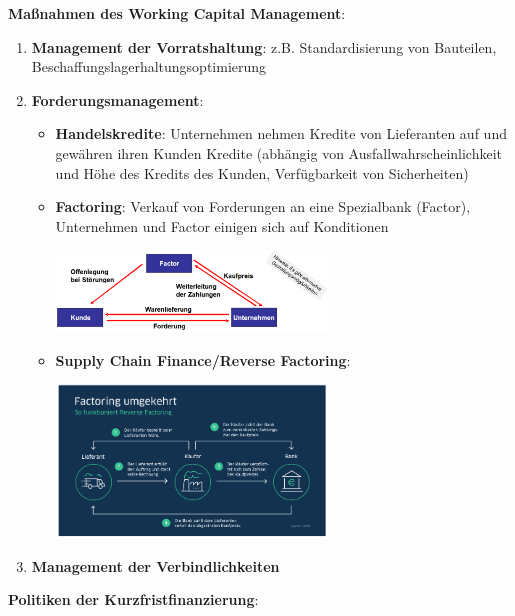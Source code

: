 \textbf{Maßnahmen des Working Capital Management}:
\begin{enumerate}
	\item \textbf{Management der Vorratshaltung}: z.B. Standardisierung von Bauteilen, Beschaffungslagerhaltungsoptimierung
	\item \textbf{Forderungsmanagement}: 
	\begin{itemize}
		\item \textbf{Handelskredite}: Unternehmen nehmen Kredite von Lieferanten auf und gewähren ihren Kunden Kredite (abhängig von Ausfallwahrscheinlichkeit und Höhe des Kredits des Kunden, Verfügbarkeit von Sicherheiten)
		\item \textbf{Factoring}: Verkauf von Forderungen an eine Spezialbank (Factor), Unternehmen und Factor einigen sich auf Konditionen
		\begin{center}
			\includegraphics[width=0.6\textwidth]{images/factoring.png}
		\end{center}
		\pagebreak
		
		\item \textbf{Supply Chain Finance/Reverse Factoring}: 
		\begin{center}
			\includegraphics[width=0.6\textwidth]{images/reverse-factoring.png}
		\end{center}
	\end{itemize}
	\item \textbf{Management der Verbindlichkeiten}
\end{enumerate}
\bigskip
\textbf{Politiken der Kurzfristfinanzierung}:
